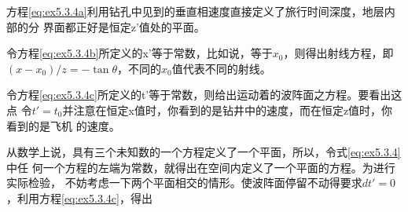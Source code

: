 方程\ref{eq:ex5.3.4a}利用钻孔中见到的垂直相速度直接定义了旅行时间深度，地层内部的分
界面都正好是恒定z'值处的平面。

令方程\ref{eq:ex5.3.4b}所定义的x'等于常数，比如说，等于$x_0$，则得出射线方程，即
$(x-x_0)/z=-\tan\theta$，不同的$x_0$值代表不同的射线。

令方程\ref{eq:ex5.3.4c}所定义的t'等于常数，则给出运动着的波阵面之方程。要看出这点
令$t'=t_0$并注意在恒定x值时，你看到的是钻井中的速度，而在恒定z值时，你看到的是飞机
的速度。

从数学上说，具有三个未知数的一个方程定义了一个平面，所以，令式\ref{eq:ex5.3.4}中任
何一个方程的左端为常数，就得出在空间内定义了一个平面的方程。为进行实际检验，
不妨考虑一下两个平面相交的情形。使波阵面停留不动得要求$dt'=0$，利用方程\ref{eq:ex5.3.4c}，得出




